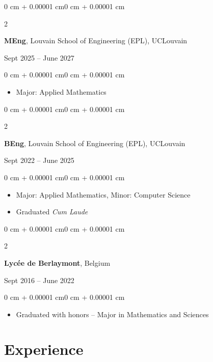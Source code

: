 \documentclass[10pt, letterpaper]{article}
\newenvironment{highlights}{
    \begin{itemize}[
        topsep=0.06 cm,
        parsep=0.06 cm,
        partopsep=0pt,
        itemsep=0pt,
        leftmargin=0 cm + 10pt
    ]
}{
    \end{itemize}
}
\newenvironment{onecolentry}{
    \begin{adjustwidth}{0 cm + 0.00001 cm}{0 cm + 0.00001 cm}
}{
    \end{adjustwidth}
}
\newenvironment{twocolentry}[2][]{
    \onecolentry
    \def\secondColumn{#2}
    \setcolumnwidth{\fill, 4.5 cm}
    \begin{paracol}{2}
}{
    \switchcolumn \raggedleft \secondColumn
    \end{paracol}
    \endonecolentry
}
\begin{document}
        \vspace{0.10 cm}

        \begin{twocolentry}{Sept 2025 – June 2027}
            \textbf{MEng}, Louvain School of Engineering (EPL), UCLouvain
        \end{twocolentry}
        \vspace{0.06 cm}
        \begin{onecolentry}
            \begin{highlights}
                \item Major: Applied Mathematics
            \end{highlights}
        \end{onecolentry}

        \vspace{0.10 cm}

        \begin{twocolentry}{Sept 2022 – June 2025}
            \textbf{BEng}, Louvain School of Engineering (EPL), UCLouvain
        \end{twocolentry}
        \vspace{0.06 cm}
        \begin{onecolentry}
            \begin{highlights}
                \item Major: Applied Mathematics, Minor: Computer Science
                \item Graduated \textit{Cum Laude}
            \end{highlights}
        \end{onecolentry}

        \vspace{0.10 cm}

        \begin{twocolentry}{Sept 2016 – June 2022}
            \textbf{Lycée de Berlaymont}, Belgium
        \end{twocolentry}
        \vspace{0.06 cm}
        \begin{onecolentry}
            \begin{highlights}
                \item Graduated with honors -- Major in Mathematics and Sciences
            \end{highlights}
        \end{onecolentry}

    \section{Experience}
\end{document}

